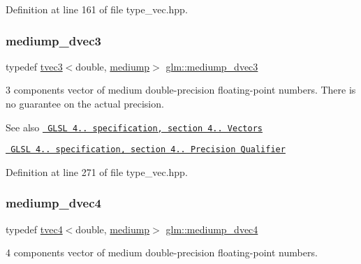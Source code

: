 Definition at line 161 of file type\+\_\+vec.\+hpp.

\mbox{\label{group__core__precision_ga4f6942e5a5c9f5dc5a0e1eed980d2ecd}} 
\subsubsection{\texorpdfstring{mediump\_dvec3}{mediump\_dvec3}}
{\footnotesize\ttfamily typedef \mbox{\hyperlink{structglm_1_1tvec3}{tvec3}}$<$double, \mbox{\hyperlink{namespaceglm_a0f04f086094c747d227af4425893f545a6416f3ea0c9025fb21ed50c4d6620482}{mediump}}$>$ \mbox{\hyperlink{group__core__precision_ga4f6942e5a5c9f5dc5a0e1eed980d2ecd}{glm\+::mediump\+\_\+dvec3}}}

3 components vector of medium double-\/precision floating-\/point numbers. There is no guarantee on the actual precision.

\begin{DoxySeeAlso}{See also}
\href{http://www.opengl.org/registry/doc/GLSLangSpec.4.20.8.pdf}{\texttt{ G\+L\+SL 4.. specification, section 4.. Vectors}} 

\href{http://www.opengl.org/registry/doc/GLSLangSpec.4.20.8.pdf}{\texttt{ G\+L\+SL 4.. specification, section 4.. Precision Qualifier}} 
\end{DoxySeeAlso}


Definition at line 271 of file type\+\_\+vec.\+hpp.

\mbox{\label{group__core__precision_gaf685121e70f851b16581c154d8b27679}} 
\subsubsection{\texorpdfstring{mediump\_dvec4}{mediump\_dvec4}}
{\footnotesize\ttfamily typedef \mbox{\hyperlink{structglm_1_1tvec4}{tvec4}}$<$double, \mbox{\hyperlink{namespaceglm_a0f04f086094c747d227af4425893f545a6416f3ea0c9025fb21ed50c4d6620482}{mediump}}$>$ \mbox{\hyperlink{group__core__precision_gaf685121e70f851b16581c154d8b27679}{glm\+::mediump\+\_\+dvec4}}}

4 components vector of medium double-\/precision floating-\/point numbers.


